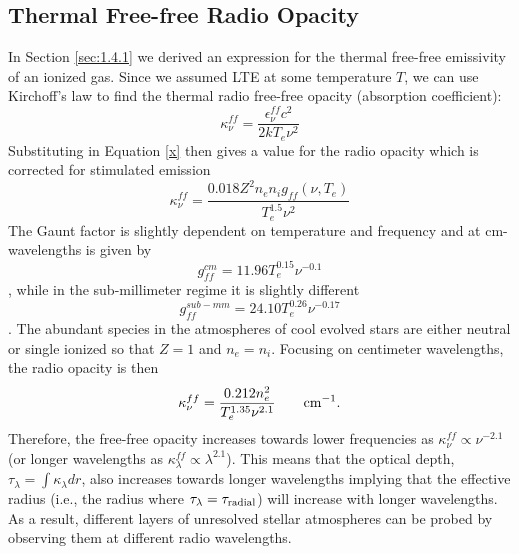 \subsection{Thermal Free-free Radio Opacity}\label{subsec:3.1.2}
In Section \ref{sec:1.4.1} we derived an expression for the thermal free-free emissivity of an ionized gas. Since we assumed LTE at some temperature $T$, we can use Kirchoff's law to find the thermal radio free-free opacity (absorption coefficient):
\begin{equation}
\kappa _{\nu}^{ff}=\frac{\epsilon _{\nu}^{ff}c^2}{2kT_{e}\nu ^2}
\end{equation}
Substituting in Equation \ref{x} then gives a value for the radio opacity which is corrected for stimulated emission
\begin{equation}
\kappa _{\nu}^{ff} = \frac{0.018Z^2n_{e}n_{i}g_{ff}(\nu ,T_{e})}{T_{e}^{1.5}\nu ^{2}}
\end{equation}
The Gaunt factor is slightly dependent on temperature and frequency and at cm-wavelengths is given by
\begin{equation}
g_{ff}^{cm}=11.96T_{e}^{0.15}\nu ^{-0.1}
\end{equation}
\citep{Altenhoff_1960}, while in the  sub-millimeter regime it is slightly different
\begin{equation}
g_{ff}^{sub-mm}=24.10T_{e}^{0.26}\nu ^{-0.17}
\end{equation}
\citep{hummer_1988}. The abundant species in the atmospheres of cool evolved stars are either neutral or single ionized so that $Z=1$ and $n_{e} = n_{i}$. Focusing on centimeter wavelengths, the radio opacity is then
\begin{equation}\label{eq:1.22}
\kappa _{\nu}^{ff} = \frac{0.212n_{e}^2}{T_{e}^{1.35}\nu ^{2.1}}\ \ \ \ \ \ \rm{cm}^{-1}.
\end{equation}
Therefore, the free-free opacity increases towards lower frequencies as $\kappa _{\nu}^{ff} \propto \nu ^{-2.1}$ (or longer wavelengths as $\kappa _{\lambda}^{ff} \propto \lambda ^{2.1}$). This means that the optical depth, $\tau _{\lambda}= \int \kappa _{\lambda} dr$, also increases towards longer wavelengths implying that the effective radius (i.e., the radius where $\tau _{\lambda} = \tau _{\rm{radial}}$) will increase with longer wavelengths. As a result, different layers of unresolved stellar atmospheres can be probed by observing them at different radio wavelengths.

